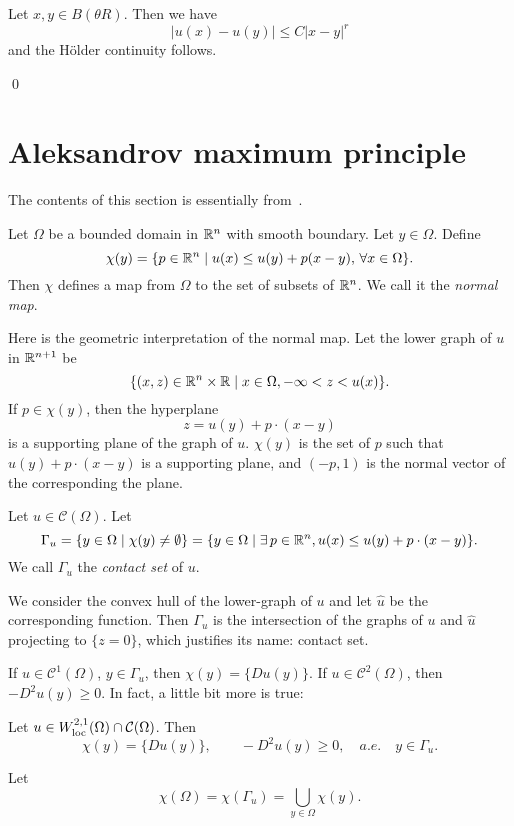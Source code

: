 Let $x,y\in  B(\theta R)$. Then we have
\[
|u(x)-u(y)|\leq 
C|x-y|^r
\]
and the H\"older continuity follows.

\qed


\section{Aleksandrov maximum principle}
The contents of this section is essentially from~\cite{chen}.
\begin{definition}\label{def8} Let $\Omega$ be a bounded domain in $\mathbb R^n$ with smooth boundary. Let $y\in\Omega$. Define
\[
\chi(y)=\{p\in\mathbb R^n\mid u(x)\leq u(y)+p(x-y),\,\forall x\in \Omega\}.
\]
Then $\chi$ defines a map from $\Omega$ to the set of subsets of $\mathbb R^n$. We call it the \emph{normal map}.
\end{definition}

Here is the geometric interpretation of the normal map. Let the lower graph of $u$ in $\mathbb R^{n+1}$ be
\[
\{(x,z)\in\mathbb R^n\times \mathbb R\mid x\in\Omega, -\infty<z<u(x)\}. 
\]
If $p\in\chi(y)$, then the hyperplane
\[
z=u(y)+p\cdot(x-y)
\]
is a supporting plane of the graph of $u$. $\chi(y)$ is the set of $p$ such that $u(y)+p\cdot(x-y)$ is a supporting plane, and $(-p,1)$ is the normal vector of the corresponding the plane.

\begin{definition}\label{def9} Let $u\in \mathcal C(\Omega)$. Let 
\[
\Gamma_u=\{y\in\Omega\mid \chi(y)\neq\emptyset\}=\{y\in\Omega\mid \exists \,p\in\mathbb R^n, u(x)\leq u(y)+p\cdot(x-y)\}.
\]
We call $\Gamma_u$ the \emph{contact set} of $u$.
\end{definition}

We consider the convex hull of the lower-graph of $u$ and let $\hat u$ be the corresponding function.
Then $\Gamma_u$ is the intersection  of the graphs of $u$ and $\hat u$ projecting to $\{z=0\}$, which justifies its name: contact set.

If $u\in \mathcal C^1(\Omega)$, $y\in\Gamma_u$, then $\chi(y)=\{Du(y)\}$. If $u\in \mathcal C^2(\Omega)$, then $-D^2u(y)\geq 0$. In fact, a little bit more is true:

\begin{lemma} Let $u\in W_{{\rm loc}}^{2,1}(\Omega)\cap \mathcal C(\Omega)$. Then
\[
\chi(y)=\{Du(y)\},\qquad -D^2u(y)\geq 0,\quad a.e.\quad y\in\Gamma_u.
\]
\end{lemma}

\begin{definition} Let
\[
\chi(\Omega)=\chi(\Gamma_u)=\bigcup_{y\in\Omega}\chi(y).
\]
\end{definition}

